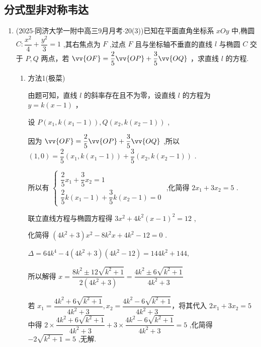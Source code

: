 \subsection*{分式型非对称韦达}
\begin{enumerate}
    \item (2025$\cdot$同济大学一附中高三9月月考$\cdot$20(3))已知在平面直角坐标系 ${xOy}$ 中,椭圆 $C : \dfrac{{x}^{2}}{4} + \dfrac{{y}^{2}}{3} = 1$ ,其右焦点为 $F$ ,过点 $F$ 且与坐标轴不垂直的直线 $l$ 与椭圆 $C$ 交于 $P,Q$ 两点，若 $\vv{OF} = \dfrac{2}{5}\vv{OP} + \dfrac{3}{5}\vv{OQ}$ ，求直线 $l$ 的方程.
    \begin{jieda}
        \begin{enumerate}
            \item 方法1(极菜)
                
            由题可知，直线 $l$ 的斜率存在且不为零，设直线 $l$ 的方程为 $y = k\left( {x - 1}\right)$ ，
            
            设 $P\left( {{x}_{1},k\left( {{x}_{1} - 1}\right) }\right) ,Q\left( {{x}_{2},k\left( {{x}_{2} - 1}\right) }\right)$ ,
            
            因为 $\vv{OF} = \dfrac{2}{5}\vv{OP} + \dfrac{3}{5}\vv{OQ}$ ,所以 $\left( {1,0}\right)  = \dfrac{2}{5}\left( {{x}_{1},k\left( {{x}_{1} - 1}\right) }\right)  + \dfrac{3}{5}\left( {{x}_{2},k\left( {{x}_{2} - 1}\right) }\right)$ .
            
            所以有 $\left\{  \begin{array}{l} \dfrac{2}{5}{x}_{1} + \dfrac{3}{5}{x}_{2} = 1 \\  \dfrac{2}{5}k\left( {{x}_{1} - 1}\right)  + \dfrac{3}{5}k\left( {{x}_{2} - 1}\right)  = 0 \end{array}\right.$ ,化简得 $2{x}_{1} + 3{x}_{2} = 5$ .

            联立直线方程与椭圆方程得 $3{x}^{2} + 4{k}^{2}{\left( x - 1\right) }^{2} = {12}$ ,
            
            化简得 $\left( {4{k}^{2} + 3}\right) {x}^{2} - 8{k}^{2}x + 4{k}^{2} - {12} = 0$ .
            
            $\Delta  = {64}{k}^{4} - 4\left( {4{k}^{2} + 3}\right) \left( {4{k}^{2} - {12}}\right)  = {144}{k}^{2} + {144},$
            
            所以解得 $x = \dfrac{8{k}^{2} \pm  {12}\sqrt{{k}^{2} + 1}}{2\left( {4{k}^{2} + 3}\right) } = \dfrac{4{k}^{2} \pm  6\sqrt{{k}^{2} + 1}}{4{k}^{2} + 3}$
            
            若 ${x}_{1} = \dfrac{4{k}^{2} + 6\sqrt{{k}^{2} + 1}}{4{k}^{2} + 3},{x}_{2} = \dfrac{4{k}^{2} - 6\sqrt{{k}^{2} + 1}}{4{k}^{2} + 3}$，将其代入 $2{x}_{1} + 3{x}_{2} = 5$ 中得 $2 \times  \dfrac{4{k}^{2} + 6\sqrt{{k}^{2} + 1}}{4{k}^{2} + 3} + 3 \times  \dfrac{4{k}^{2} - 6\sqrt{{k}^{2} + 1}}{4{k}^{2} + 3} = 5$ ,化简得 $- 2\sqrt{{k}^{2} + 1} = 5$ ,无解.
            

\end{enumerate}
\end{jieda}
\end{enumerate}
